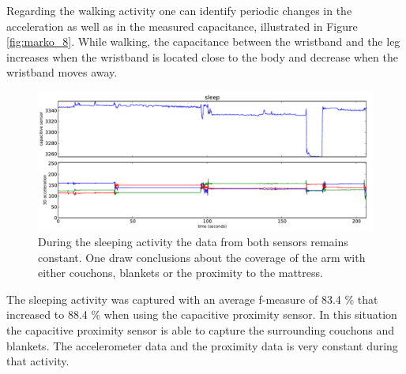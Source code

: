 \documentclass[runningheads,a4paper]{llncs}
\begin{document}
Regarding the walking activity one can identify periodic changes in the acceleration as well as in the measured capacitance, illustrated in Figure \ref{fig:marko_8}. While walking, the capacitance between the wristband and the leg increases when the wristband is located close to the body and decrease when the wristband moves away. 

\begin{figure}[htbp]
	\centering
		\includegraphics[width=1.00\textwidth]{../Auswertung/images/eugen_9.pdf}
	\caption{During the sleeping activity the data from both sensors remains constant. One draw conclusions about the coverage of the arm with either couchons, blankets or the proximity to the mattress.}
	\label{fig:eugen_9}
\end{figure}

The sleeping activity was captured with an average f-measure of 83.4 \% that increased to 88.4 \% when using the capacitive proximity sensor. In this situation the capacitive proximity sensor is able to capture the surrounding couchons and blankets. The accelerometer data and the proximity data is very constant during that activity. 
\end{document}

